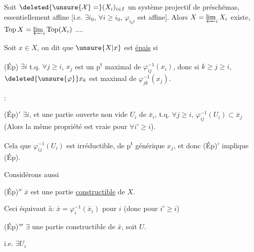 Soit $\deleted{\unsure{\mathcal X}=}(X_i)_{i\in I}$ un système projectif de préschémas, essentiellement affine [i.e. $\exists i_0$, $\forall i\geq i_0$, $\varphi_{i_0i}$ est affine]. Alors $X=\varprojlim_i X_i$ existe, $\mathrm{Top}\,X=\varprojlim_i\mathrm{Top}(X_i)$ $\ldots$.

Soit $x\in X$, on dit que $\unsure{X|x}$ est \uline{épais} si

(Ép) $\exists i$ t.q. $\forall j\geq i$, $x_j$ est un p\textsuperscript{t} maximal de $\varphi_{ij}^{-1}(x_i)$, donc si $k\geq j\geq i$, $\deleted{\unsure{\varphi}}x_k$ est maximal de $\varphi_{jk}^{-1}(x_j)$.

:

(Ép)$'$ $\exists i$,  et une partie ouverte non vide $U_i$ de $\bar x_i$, t.q. $\forall j\geq i$, $\varphi_{ij}^{-1}(U_i)\subset\bar x_j$ (Alors la même propriété est vraie pour $\forall i'\geq i$).

Cela  que $\varphi_{ij}^{-1}(U_i)$ est irréductible, de p\textsuperscript{t} générique $x_j$, et donc (Ép)$'$ implique (Ép).

Considérons aussi

(Ép)$''$ $\bar x$  est une partie \uline{constructible} de $X$.

Ceci équivaut  à: $\bar x=\varphi_i^{-1}(\bar x_i)$ pour $i$   (donc pour $i'\geq i$)

(Ép)$'''$ $\exists$ une partie constructible   de $\bar x$, soit $U$.

i.e. $\exists U_i$
